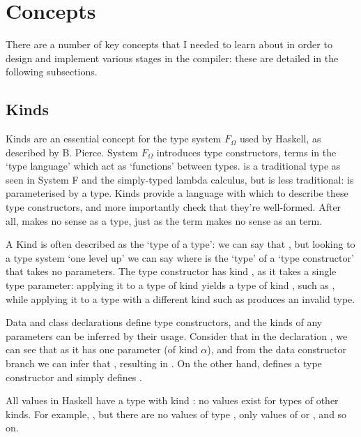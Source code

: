 \documentclass[dissertation.tex]{subfiles}
\begin{document}
\section{Concepts}
{
    There are a number of key concepts that I needed to learn about in order to design and implement various stages in the compiler: these are detailed in the following subsections.

    \subsection{Kinds}\label{sec:kinds}
    {
        Kinds are an essential concept for the type system \(F_\Omega\) used by Haskell, as described by B. Pierce\cite{TAPL}. System \(F_\Omega\) introduces type constructors, terms in the `type language' which act as `functions' between types.  is a traditional type as seen in System F and the simply-typed lambda calculus, but  is less traditional:  is parameterised by a type. Kinds provide a language with which to describe these type constructors, and more importantly check that they're well-formed. After all,  makes no sense as a type, just as the term  makes no sense as an term.

        A Kind is often described as the `type of a type': we can say that , but looking to a type system `one level up' we can say  where \haskell{*} is the `type' of a `type constructor' that takes no parameters. The type constructor  has kind \haskell{* -> *}, as it takes a single type parameter: applying it to a type of kind \haskell{*} yields a type of kind \haskell{*}, such as , while applying it to a type with a different kind such as  produces an invalid type.

        Data and class declarations define type constructors, and the kinds of any parameters can be inferred by their usage. Consider that in the declaration , we can see that  as it has one parameter (of kind \(\alpha\)), and from the data constructor branch  we can infer that \haskell{#\(\alpha\)# = *}, resulting in . On the other hand,  defines a type constructor  and  simply defines .

        All values in Haskell have a type with kind \haskell{*}: no values exist for types of other kinds. For example, , but there are no values of type , only values of  or , and so on.

}}
\end{document}
